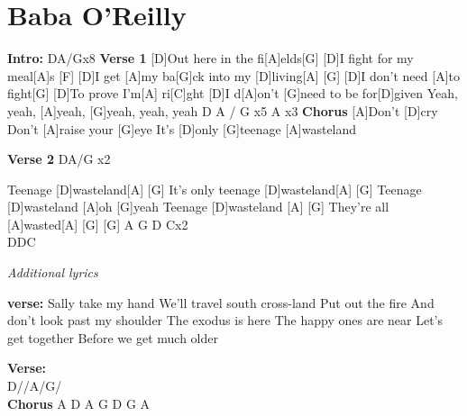 \documentclass{article}
\begin{document}
\section{Baba O'Reilly}

\begin{guitar}
\begin{multicols}{2}
  \textbf{Intro:} DA/Gx8
  \textbf{Verse 1}
  [D]Out here in the fi[A]elds[G]\hfill 
  [D]I fight for my meal[A]s [F]\hfill
  [D]I get [A]my ba[G]ck into my [D]living[A] [G]\hfill
  [D]I don't need [A]to fight[G]\hfill
  [D]To prove I'm[A] ri[C]ght
  [D]I d[A]on't [G]need to be for[D]given
  Yeah, yeah, [A]yeah, [G]yeah, yeah, yeah
  D   A  / G x5
  A x3
  \textbf{Chorus}
  [A]Don't [D]cry
  Don't [A]raise your [G]eye
  It's [D]only [G]teenage [A]wasteland
  
  \textbf{Verse 2}
  DA/G x2
  
  Teenage [D]wasteland[A] [G]\hfill
  It's only teenage [D]wasteland[A] [G]\hfill
  Teenage [D]wasteland [A]oh [G]yeah
  Teenage [D]wasteland [A] [G]\hfill
  They're all [A]wasted[A] [G] [G]\hfill
  A G D Cx2\\
  DDC
\end{multicols}

\begin{center}
\textit{Additional lyrics}

\end{center}

\begin{multicols}{2}
  \begin{flushleft}
    \textbf{verse:}
    Sally take my hand
    We'll travel south cross-land
    Put out the fire
    And don't look past my shoulder
    The exodus is here
    The happy ones are near
    Let's get together
Before we get much older

    \columnbreak
\end{flushleft}
\end{multicols}
\end{guitar}

\textbf{Verse:}\\
D//A/G/\\
\textbf{Chorus}
A D
A G
D G A
\end{document}
